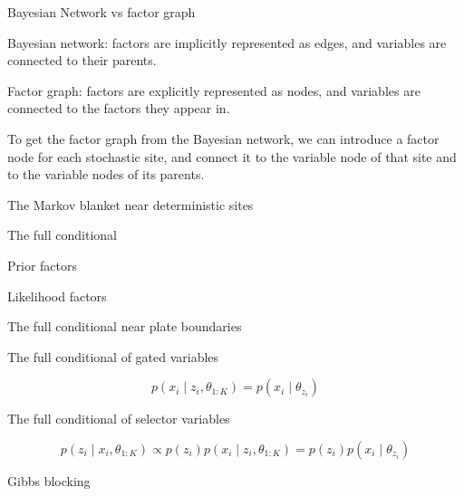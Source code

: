 \documentclass[10pt,aspectratio=169]{beamer}
\begin{document}
\begin{frame}{Bayesian Network vs factor graph}

    Bayesian network: factors are implicitly represented as edges, and variables are connected to their parents.

    Factor graph: factors are explicitly represented as nodes, and variables are connected to the factors they appear in.

    To get the factor graph from the Bayesian network, we can introduce a factor node for each stochastic site, and connect it to the variable node of that site and to the variable nodes of its parents.

\end{frame}

\begin{frame}{The Markov blanket near deterministic sites}
\end{frame}

\begin{frame}{The full conditional}

    Prior factors

    Likelihood factors

\end{frame}

\begin{frame}{The full conditional near plate boundaries}
\end{frame}

\begin{frame}{The full conditional of gated variables}

    \begin{equation}
        p(x_i \mid z_i, \theta_{1:K}) = p(x_i \mid \theta_{z_i})
    \end{equation}

\end{frame}

\begin{frame}{The full conditional of selector variables}

    \begin{equation}
        p(z_i \mid x_i, \theta_{1:K}) \propto 
            p(z_i) p(x_i \mid z_i, \theta_{1:K}) =
            p(z_i) p(x_i \mid \theta_{z_i})
    \end{equation}

\end{frame}

\begin{frame}{Gibbs blocking}
\end{frame}
\end{document}
